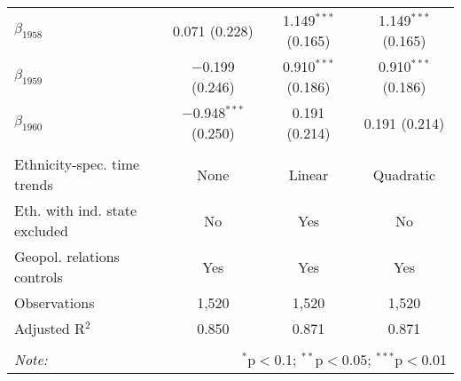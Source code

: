 \begin{table}[!h]
\begin{tabular}{@{\extracolsep{5pt}}lccc}
  $\beta_{1958}$ & 0.071 (0.228) & 1.149$^{***}$ (0.165) & 1.149$^{***}$ (0.165) \\ 
  $\beta_{1959}$ & $-$0.199 (0.246) & 0.910$^{***}$ (0.186) & 0.910$^{***}$ (0.186) \\ 
  $\beta_{1960}$ & $-$0.948$^{***}$ (0.250) & 0.191 (0.214) & 0.191 (0.214) \\ 
 \hline \\[-1.8ex] 
Ethnicity-spec. time trends & None & Linear & Quadratic \\ 
Eth. with ind. state excluded & No & Yes & No \\ 
Geopol. relations controls & Yes & Yes & Yes \\ 
Observations & 1,520 & 1,520 & 1,520 \\ 
Adjusted R$^{2}$ & 0.850 & 0.871 & 0.871 \\ 
\hline 
\hline \\[-1.8ex] 
\textit{Note:}  & \multicolumn{3}{r}{$^{*}$p$<$0.1; $^{**}$p$<$0.05; $^{***}$p$<$0.01} \\ 
\end{tabular} 
\end{table} 
